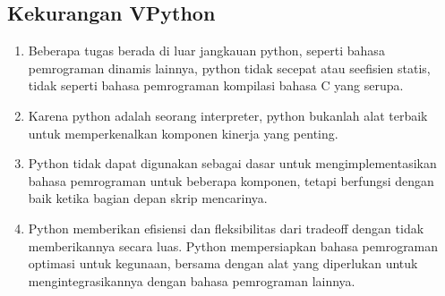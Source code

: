 \subsection{Kekurangan VPython}
		\begin {enumerate}
			\item Beberapa tugas berada di luar jangkauan python, seperti bahasa pemrograman dinamis lainnya, python tidak secepat atau seefisien statis, tidak seperti bahasa pemrograman kompilasi bahasa C yang serupa.
			\item Karena python adalah seorang interpreter, python bukanlah alat terbaik untuk memperkenalkan komponen kinerja yang penting.
			\item Python tidak dapat digunakan sebagai dasar untuk mengimplementasikan bahasa pemrograman untuk beberapa komponen, tetapi berfungsi dengan baik ketika bagian depan skrip mencarinya.
			\item Python memberikan efisiensi dan fleksibilitas dari tradeoff dengan tidak memberikannya secara luas. Python mempersiapkan bahasa pemrograman optimasi untuk kegunaan, bersama dengan alat yang diperlukan untuk mengintegrasikannya dengan bahasa pemrograman lainnya.
		\end{enumerate}

